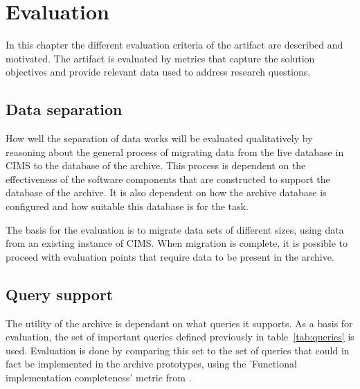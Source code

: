 \chapter{Evaluation}
\label{chap:eval}

In this chapter the different evaluation criteria of the artifact are described and motivated. The artifact is evaluated by metrics that capture the solution objectives and provide relevant data used to address research questions.

 
\section{Data separation}
How well the separation of data works will be evaluated qualitatively by reasoning about the general process of migrating data from the live database in CIMS to the database of the archive. This process is dependent on the effectiveness of the software components that are constructed to support the database of the archive. It is also dependent on how the archive database is configured and how suitable this database is for the task.

The basis for the evaluation is to migrate data sets of different sizes, using data from an existing instance of CIMS. When migration is complete, it is possible to proceed with evaluation points that require data to be present in the archive.  



\section{Query support}
The utility of the archive is dependant on what queries it supports. As a basis for evaluation, the set of important queries defined previously in table~\ref{tab:queries} is used. Evaluation is done by comparing this set to the set of queries that could in fact be implemented in the archive prototypes, using the 'Functional implementation completeness' metric from \cite{isoExternalMetric}.

